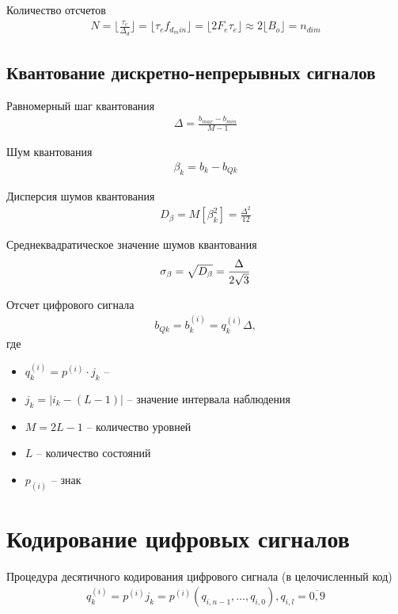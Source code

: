 Количество отсчетов
\begin{align}
	N = \lfloor \frac{\tau_{e}}{\Delta_{d}} \rfloor = \lfloor \tau_{e}f_{d_min} \rfloor = \lfloor 2F_{e}\tau_{e} \rfloor \approx 2 \lfloor B_{o}\rfloor  = n_{dim}
\end{align}

\section{Квантование дискретно-непрерывных сигналов}

Равномерный шаг квантования
\begin{align}
	\Delta = \frac{b_{max} - b_{min}}{M - 1}
\end{align}

Шум квантования
\begin{align}
	\beta_{k} = b_{k} - b_{Qk}
\end{align}

Дисперсия шумов квантования
\begin{align}
	D_{\beta} = M[\beta_{k}^{2}] = \frac{\Delta^{2}}{12} 
\end{align}

Среднеквадратическое значение шумов квантования
\begin{align}
	\sigma_{\beta} = \sqrtsign{D_{\beta}} = \frac{\Delta}{2\sqrtsign{3}}
\end{align}

Отсчет цифрового сигнала
\begin{align}
	b_{Qk} = b_{k}^{(i)} = q_{k}^{(i)}\Delta,
\end{align}
где 
\begin{itemize}
	\item $q_{k}^{(i)} = p^{(i)} \cdot j_{k}$ -- 
	\item $j_{k} = |i_{k} - (L - 1)|$ -- значение интервала наблюдения
	\item $M = 2L - 1$ -- количество уровней
	\item $L$ -- количество состояний
	\item $p_{(i)}$ -- знак
\end{itemize}

\chapter{Кодирование цифровых сигналов}

Процедура десятичного кодирования цифрового сигнала (в целочисленный код)
\begin{align}
	q_{k}^{(i)} = p^{(i)}j_{k} = p^{(i)}(q_{i, n - 1}, ..., q_{i, 0}), q_{i, l} = \overline{0, 9}
\end{align}

